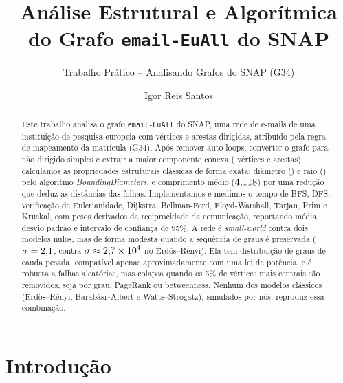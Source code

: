 \documentclass[sigconf]{webmedia}
\begin{document}
\title[Analisando o grafo email-EuAll do SNAP]{Análise Estrutural e Algorítmica do Grafo \texttt{email-EuAll} do SNAP}
\subtitle{Trabalho Prático -- Analisando Grafos do SNAP (G34)}

\author{Igor Reis Santos}

\renewcommand{\shortauthors}{Igor Reis Santos}

\begin{abstract}
Este trabalho analisa o grafo \texttt{email-EuAll} do SNAP, uma rede de e-mails de uma
instituição de pesquisa europeia com \nVBruto{} vértices e \nEBruto{} arestas dirigidas,
atribuído pela regra de mapeamento da matrícula (G34). Após remover auto-loops,
converter o grafo para não dirigido simples e extrair a maior componente conexa
(\nVLcc{} vértices e \nELcc{} arestas), calculamos as propriedades estruturais clássicas
de forma exata: diâmetro (\diametro) e raio (\raio) pelo algoritmo
\emph{BoundingDiameters}, e comprimento médio ($4{,}118$) por uma redução que deduz as
distâncias das folhas. Implementamos e medimos o tempo de BFS, DFS, verificação de
Eulerianidade, Dijkstra, Bellman-Ford, Floyd-Warshall, Tarjan, Prim e Kruskal, com pesos
derivados da reciprocidade da comunicação, reportando média, desvio padrão e intervalo de
confiança de 95\%. A rede é \emph{small-world} contra dois modelos nulos, mas de forma
modesta quando a sequência de graus é preservada ($\sigma=2{,}1$, contra
$\sigma\approx2{,}7\times10^{4}$ no Erd\H{o}s--Rényi). Ela tem distribuição de graus de cauda pesada,
compatível apenas aproximadamente com uma lei de potência, e é robusta a falhas
aleatórias, mas colapsa quando os 5\% de vértices mais centrais são removidos, seja
por grau, PageRank ou betweenness. Nenhum dos modelos clássicos (Erd\H{o}s--Rényi,
Barabási--Albert e Watts--Strogatz), simulados por nós, reproduz essa combinação.
\end{abstract}


\maketitle

\section{Introdução}
\end{document}
